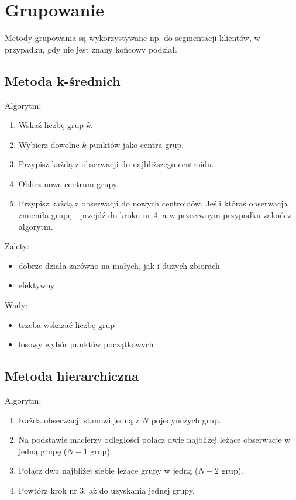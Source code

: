 \documentclass[]{book}
\providecommand{\tightlist}{%
  \setlength{\itemsep}{0pt}\setlength{\parskip}{0pt}}
\begin{document}
\chapter{Grupowanie}\label{grupowanie}

Metody grupowania są wykorzystywane np. do segmentacji klientów, w
przypadku, gdy nie jest znany końcowy podział.

\section{Metoda k-średnich}\label{metoda-k-srednich}

Algorytm:

\begin{enumerate}
\def\labelenumi{\arabic{enumi}.}
\tightlist
\item
  Wskaź liczbę grup \(k\).
\item
  Wybierz dowolne \(k\) punktów jako centra grup.
\item
  Przypisz każdą z obserwacji do najbliższego centroidu.
\item
  Oblicz nowe centrum grupy.
\item
  Przypisz każdą z obserwacji do nowych centroidów. Jeśli któraś
  obserwacja zmieniła grupę - przejdź do kroku nr 4, a w przeciwnym
  przypadku zakończ algorytm.
\end{enumerate}

Zalety:

\begin{itemize}
\tightlist
\item
  dobrze działa zarówno na małych, jak i dużych zbiorach
\item
  efektywny
\end{itemize}

Wady:

\begin{itemize}
\tightlist
\item
  trzeba wskazać liczbę grup
\item
  losowy wybór punktów początkowych
\end{itemize}

\section{Metoda hierarchiczna}\label{metoda-hierarchiczna}

Algorytm:

\begin{enumerate}
\def\labelenumi{\arabic{enumi}.}
\tightlist
\item
  Każda obserwacji stanowi jedną z \(N\) pojedyńczych grup.
\item
  Na podstawie macierzy odległości połącz dwie najbliżej leżące
  obserwacje w jedną grupę (\(N-1\) grup).
\item
  Połącz dwa najbliżej siebie leżące grupy w jedną (\(N-2\) grup).
\item
  Powtórz krok nr 3, aż do uzyskania jednej grupy.
\end{enumerate}
\end{document}
